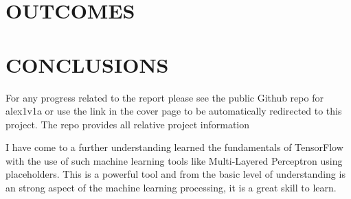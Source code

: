 \documentclass[a4paper, 10pt]{IEEEconf}
\begin{document}

\section{OUTCOMES}

%



\section{CONCLUSIONS}

For any progress related to the report please see the public Github repo for alex1v1a or use the link in the cover page to be automatically redirected to this project. The repo provides all relative project information

I have come to a further understanding learned the fundamentals of TensorFlow with the use of such machine learning tools like Multi-Layered Perceptron using placeholders. This is a powerful tool and from the basic level of understanding is an strong aspect of the machine learning processing, it is a great skill to learn.


\nocite{*}




\clearpage
\onecolumn
\end{document}
